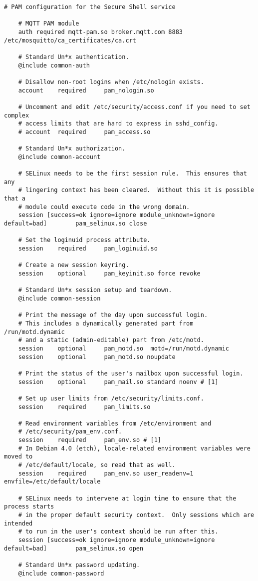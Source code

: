 \begin{lstlisting}[style=Consola, caption={Archivo de configuración PAM para sshd}, label={code:pam-sshd}]
    # PAM configuration for the Secure Shell service

    # MQTT PAM module
    auth required mqtt-pam.so broker.mqtt.com 8883 /etc/mosquitto/ca_certificates/ca.crt

    # Standard Un*x authentication.
    @include common-auth

    # Disallow non-root logins when /etc/nologin exists.
    account    required     pam_nologin.so

    # Uncomment and edit /etc/security/access.conf if you need to set complex
    # access limits that are hard to express in sshd_config.
    # account  required     pam_access.so

    # Standard Un*x authorization.
    @include common-account

    # SELinux needs to be the first session rule.  This ensures that any
    # lingering context has been cleared.  Without this it is possible that a
    # module could execute code in the wrong domain.
    session [success=ok ignore=ignore module_unknown=ignore default=bad]        pam_selinux.so close

    # Set the loginuid process attribute.
    session    required     pam_loginuid.so

    # Create a new session keyring.
    session    optional     pam_keyinit.so force revoke

    # Standard Un*x session setup and teardown.
    @include common-session

    # Print the message of the day upon successful login.
    # This includes a dynamically generated part from /run/motd.dynamic
    # and a static (admin-editable) part from /etc/motd.
    session    optional     pam_motd.so  motd=/run/motd.dynamic
    session    optional     pam_motd.so noupdate

    # Print the status of the user's mailbox upon successful login.
    session    optional     pam_mail.so standard noenv # [1]

    # Set up user limits from /etc/security/limits.conf.
    session    required     pam_limits.so

    # Read environment variables from /etc/environment and
    # /etc/security/pam_env.conf.
    session    required     pam_env.so # [1]
    # In Debian 4.0 (etch), locale-related environment variables were moved to
    # /etc/default/locale, so read that as well.
    session    required     pam_env.so user_readenv=1 envfile=/etc/default/locale

    # SELinux needs to intervene at login time to ensure that the process starts
    # in the proper default security context.  Only sessions which are intended
    # to run in the user's context should be run after this.
    session [success=ok ignore=ignore module_unknown=ignore default=bad]        pam_selinux.so open

    # Standard Un*x password updating.
    @include common-password
\end{lstlisting}

